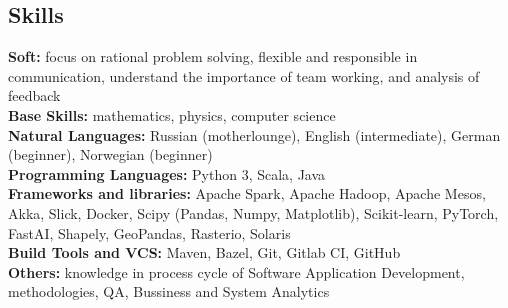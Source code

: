 \subsection*{Skills}
\textbf{Soft:} focus on rational problem solving, flexible and responsible in communication, 
understand the importance of team working, and analysis of feedback \\
\textbf{Base Skills:} mathematics, physics, computer science \\
\textbf{Natural Languages:} Russian (motherlounge), English (intermediate), German (beginner), Norwegian (beginner) \\
\textbf{Programming Languages:} Python 3, Scala, Java\\
\textbf{Frameworks and libraries:} Apache Spark, Apache Hadoop, Apache Mesos, Akka, Slick, Docker, Scipy (Pandas, Numpy,
Matplotlib), Scikit-learn, PyTorch, FastAI, Shapely, GeoPandas, Rasterio, Solaris \\
\textbf{Build Tools and VCS:} Maven, Bazel, Git, Gitlab CI, GitHub \\
\textbf{Others:} knowledge in process cycle of Software Application Development, methodologies, QA, Bussiness and System Analytics